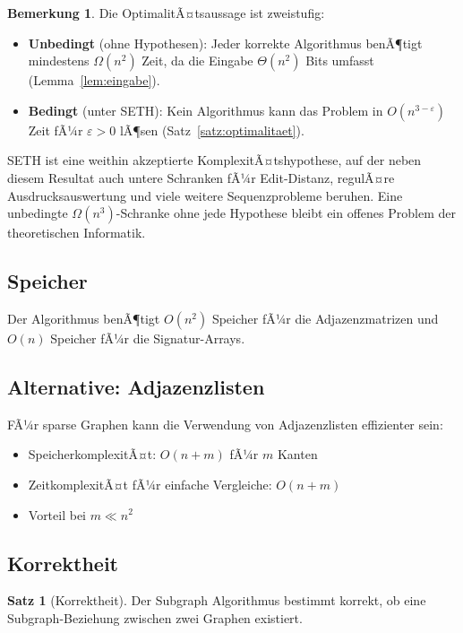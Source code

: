 ﻿\documentclass[a4paper,12pt]{article}
\theoremstyle{definition}
\newtheorem{satz}{Satz}
\newtheorem{bemerkung}{Bemerkung}
\begin{document}
\begin{bemerkung}
Die OptimalitÃ¤tsaussage ist zweistufig:
\begin{itemize}
	\item \textbf{Unbedingt} (ohne Hypothesen): Jeder korrekte Algorithmus benÃ¶tigt mindestens
	      $\Omega(n^2)$ Zeit, da die Eingabe $\Theta(n^2)$ Bits umfasst (Lemma~\ref{lem:eingabe}).
	\item \textbf{Bedingt} (unter SETH): Kein Algorithmus kann das Problem in $O(n^{3-\varepsilon})$
	      Zeit fÃ¼r $\varepsilon > 0$ lÃ¶sen (Satz~\ref{satz:optimalitaet}).
\end{itemize}
SETH ist eine weithin akzeptierte KomplexitÃ¤tshypothese, auf der neben diesem Resultat auch
untere Schranken fÃ¼r Edit-Distanz, regulÃ¤re Ausdrucksauswertung und viele weitere Sequenzprobleme
beruhen. Eine unbedingte $\Omega(n^3)$-Schranke ohne jede Hypothese bleibt ein offenes Problem
der theoretischen Informatik.
\end{bemerkung}

\subsection{Speicher}

Der Algorithmus benÃ¶tigt $O(n^2)$ Speicher fÃ¼r die Adjazenzmatrizen und $O(n)$ Speicher fÃ¼r die Signatur-Arrays.

\subsection{Alternative: Adjazenzlisten}

FÃ¼r sparse Graphen kann die Verwendung von Adjazenzlisten effizienter sein:

\begin{itemize}
	\item SpeicherkomplexitÃ¤t: $O(n + m)$ fÃ¼r $m$ Kanten
	\item ZeitkomplexitÃ¤t fÃ¼r einfache Vergleiche: $O(n + m)$
	\item Vorteil bei $m \ll n^2$
\end{itemize}

\subsection{Korrektheit}

\begin{satz}[Korrektheit]
	Der Subgraph Algorithmus bestimmt korrekt, ob eine Subgraph-Beziehung zwischen zwei Graphen existiert.
\end{satz}
\end{document}
